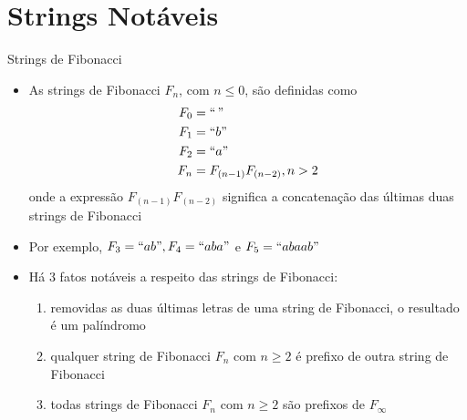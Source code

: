 \section{Strings Notáveis}

\begin{frame}[fragile]{Strings de Fibonacci}

    \begin{itemize}
        \item As strings de Fibonacci $F_n$, com $n \leq 0$, são definidas como
        \begin{align*}
            F_0 &= ``\," \\
            F_1 &= ``b" \\
            F_2 &= ``a" \\
            F_n &= F_{(n-1)}F_{(n-2)}, n > 2
            \end{align*}
        onde a expressão $F_{(n-1)}F_{(n-2)}$ significa a concatenação das últimas duas strings de 
        Fibonacci

        \item Por exemplo, $F_3 = ``ab", F_4 = ``aba"$ e $F_5 = ``abaab"$

        \item Há 3 fatos notáveis a respeito das strings de Fibonacci:
        \begin{enumerate}
            \item removidas as duas últimas letras de uma string de Fibonacci, o resultado é um 
                palíndromo
            \item qualquer string de Fibonacci $F_n$ com $n\geq 2$ é prefixo de outra string de Fibonacci
            \item todas strings de Fibonacci $F_n$ com $n\geq 2$ são prefixos de $F_\infty$
        \end{enumerate}

    \end{itemize}

\end{frame}

